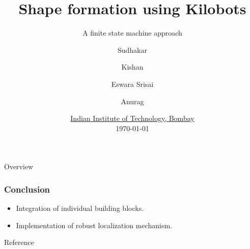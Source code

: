 \documentclass{beamer}
\title[Seminar presentation] %
{Shape formation using Kilobots}
\subtitle{A finite state machine approach}
\author[shortname]{Sudhakar\inst{1} \and Kishan\inst{1} \and Eswara Srisai\inst{1} \and Anurag\inst{1}}
\institute[VFU] %
{
  \inst{1}%
  M.Tech scholar\\
  Systems and Control Engineering
}
\date[VLC 2013] %
{\href{http://www.iitb.ac.in/}{Indian Institute of Technology, Bombay}\\\today}
\begin{document}
\setlength\abovecaptionskip{-2pt}	
\setlength{\abovedisplayskip}{0pt}
\setlength{\belowdisplayskip}{0pt}
\setlength{\abovedisplayshortskip}{0pt}
\setlength{\belowdisplayshortskip}{0pt}

\frame{\titlepage}
\begin{frame}{Overview}
\tableofcontents
\end{frame}





\begin{frame}
\frametitle{Conclusion}
\begin{itemize}
	\item Integration of individual building blocks.
	\item Implementation of robust localization mechanism.
\end{itemize}
\end{frame}

\begin{frame}[allowframebreaks]{Reference}
\AtNextBibliography{\small}
\printbibliography
\end{frame}
\end{document}
